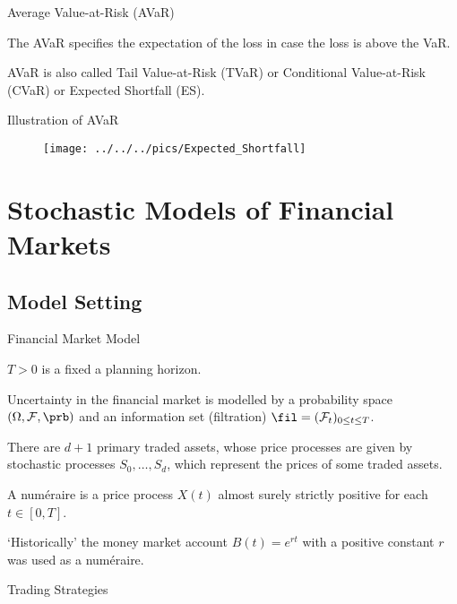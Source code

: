{Average Value-at-Risk (AVaR) }






	The AVaR specifies the expectation of the loss in case the loss is above the VaR.

	AVaR is also called Tail Value-at-Risk (TVaR) or Conditional
Value-at-Risk (CVaR) or  Expected Shortfall (ES).






{Illustration of AVaR}
\begin{figure}
	\centering
		\texttt{[image: ../../../pics/Expected\_Shortfall]}
	\label{fig:Expected_Shortfall}
\end{figure}

\section{Stochastic Models of Financial Markets}
\subsection{Model Setting}

{ Financial Market Model}






$T>0$ is a fixed a planning horizon.

Uncertainty in the financial market is modelled by a probability
space $(\Omega, {\cal F},\prb)$ and an information set  (filtration) $\fil =({\cal
F}_t)_{0\leq t\leq T}$.

There are $d+1$ primary traded assets, whose price processes are
given by stochastic processes $S_0, \ldots, S_d$, which represent
the prices of some traded assets.

A num\'{e}raire is a price process $X(t)$ almost surely strictly
positive for each $t \in [0,T]$.

\lq {Historically}' the money market account $B(t)=e^{rt}$ with a
positive constant $r$ was used as a
num\'{e}raire.






{ Trading Strategies}




